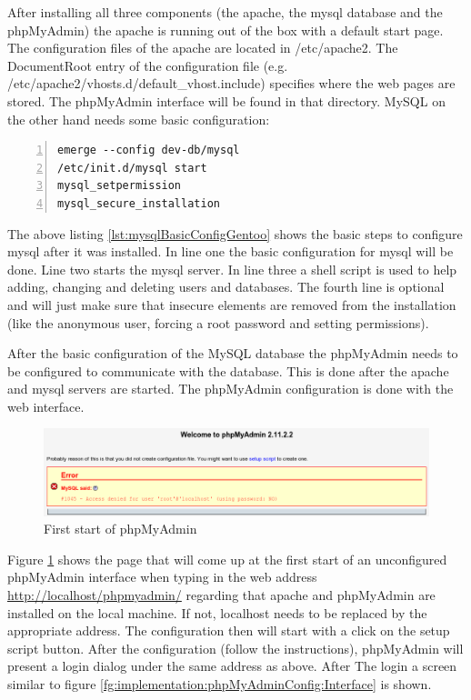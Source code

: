   After installing all three components (the apache, the mysql database and the phpMyAdmin) the apache is running out of the box with a default start page. The configuration files of the apache are located in /etc/apache2. The DocumentRoot entry of the configuration file (e.g. /etc/apache2/vhosts.d/default\_vhost.include) specifies where the web pages are stored. The phpMyAdmin interface will be found in that directory. MySQL on the other hand needs some basic configuration:\\

  \begin{lstlisting}[frame=single,numbers=left,basicstyle=\footnotesize,label=lst:mysqlBasicConfigGentoo,captionpos=b,caption={Basic MySQL configuration in Gentoo}]
emerge --config dev-db/mysql
/etc/init.d/mysql start
mysql_setpermission
mysql_secure_installation 
  \end{lstlisting}

  The above listing \ref{lst:mysqlBasicConfigGentoo} shows the basic steps to configure mysql after it was installed. In line one the basic configuration for mysql will be done. Line two starts the mysql server. In line three a shell script is used to help adding, changing and deleting users and databases. The fourth line is optional and will just make sure that insecure elements are removed from the installation (like the anonymous user, forcing a root password and setting permissions).

  After the basic configuration of the MySQL database the phpMyAdmin needs to be configured to communicate with the database. This is done after the apache and mysql servers are started. The phpMyAdmin configuration is done with the web interface.

  \begin{figure}[h]
   \centering
   \includegraphics[scale=0.55]{images/ScreenShot-phpMyAdmin-startConfig.png}
   \caption{First start of phpMyAdmin}
   \label{fg:implementation:phpMyAdminConfig:Start}
  \end{figure}

  Figure \ref{fg:implementation:phpMyAdminConfig:Start} shows the page that will come up at the first start of an unconfigured phpMyAdmin interface when typing in the web address \url{http://localhost/phpmyadmin/} regarding that apache and phpMyAdmin are installed on the local machine. If not, localhost needs to be replaced by the appropriate address. The configuration then will start with a click on the setup script button. After the configuration (follow the instructions), phpMyAdmin will present a login dialog under the same address as above. After The login a screen similar to figure \ref{fg:implementation:phpMyAdminConfig:Interface} is shown.

